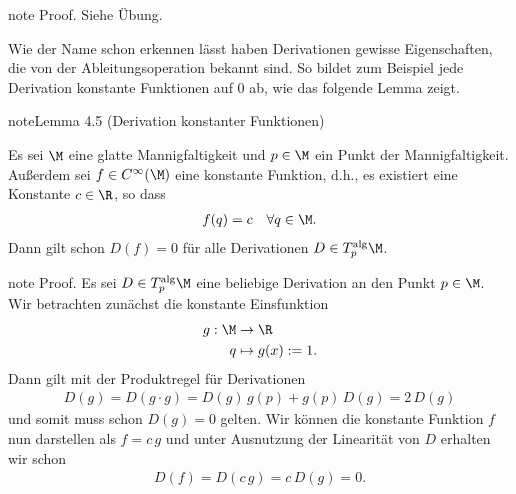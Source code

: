 \documentclass[letterpaper,10pt,german]{jupyterBook}
\begin{document}
\begin{sphinxadmonition}{note}
\sphinxAtStartPar
Proof. Siehe Übung.
\end{sphinxadmonition}

\sphinxAtStartPar
Wie der Name schon erkennen lässt haben Derivationen gewisse Eigenschaften, die von der Ableitungsoperation bekannt sind.
So bildet zum Beispiel jede Derivation konstante Funktionen auf \(0\) ab, wie das folgende Lemma zeigt.
\label{manifolds/tangential:lem:constder}
\begin{sphinxadmonition}{note}{Lemma 4.5 (Derivation konstanter Funktionen)}



\sphinxAtStartPar
Es sei \(\M\) eine glatte Mannigfaltigkeit und \(p\in\M\) ein Punkt der Mannigfaltigkeit.
Außerdem sei \(f\in C^\infty(\M)\) eine konstante Funktion, d.h., es existiert eine Konstante \(c\in\R\), so dass
\begin{equation*}
\begin{split}f(q) = c\quad\forall q\in\M.\end{split}
\end{equation*}
\sphinxAtStartPar
Dann gilt schon \(D(f)=0\) für alle Derivationen \(D\in T^{\text{alg}}_p\M\).
\end{sphinxadmonition}

\begin{sphinxadmonition}{note}
\sphinxAtStartPar
Proof. Es sei \(D\in T^{\text{alg}}_p\M\) eine beliebige Derivation an den Punkt \(p \in \M\).
Wir betrachten zunächst die konstante Einsfunktion
\begin{equation*}
\begin{split}g:\M &\to \R\\
q &\mapsto g(x) := 1.\end{split}
\end{equation*}
\sphinxAtStartPar
Dann gilt mit der Produktregel für Derivationen
\begin{equation*}
\begin{split}D(g) = D(g\cdot g) = D(g)\,g(p) + g(p)\, D(g) = 2\,D(g)\end{split}
\end{equation*}
\sphinxAtStartPar
und somit muss schon \(D(g) = 0\) gelten.
Wir können die konstante Funktion \(f\) nun darstellen als \(f= c\,g\) und unter Ausnutzung der Linearität von \(D\) erhalten wir schon
\begin{equation*}
\begin{split}D(f) = D(c\,g) = c\,D(g) = 0.\end{split}
\end{equation*}\end{sphinxadmonition}
\end{document}
